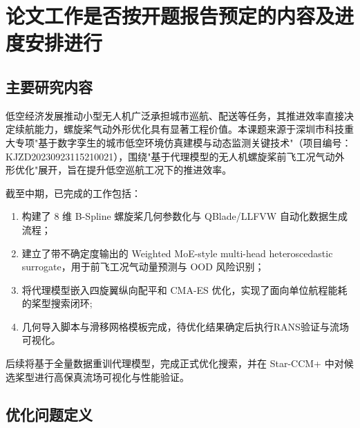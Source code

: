 
\section{论文工作是否按开题报告预定的内容及进度安排进行}

\subsection{主要研究内容}
低空经济发展推动小型无人机广泛承担城市巡航、配送等任务，其推进效率直接决定续航能力，螺旋桨气动外形优化具有显著工程价值。本课题来源于深圳市科技重大专项"基于数字孪生的城市低空环境仿真建模与动态监测关键技术"（项目编号：KJZD20230923115210021），围绕"基于代理模型的无人机螺旋桨前飞工况气动外形优化"展开，旨在提升低空巡航工况下的推进效率。

\noindent 截至中期，已完成的工作包括：
\begin{enumerate}
  \item 构建了 8 维 B-Spline 螺旋桨几何参数化与 QBlade/LLFVW 自动化数据生成流程；
  \item 建立了带不确定度输出的 Weighted MoE-style multi-head heteroscedastic surrogate，用于前飞工况气动量预测与 OOD 风险识别；
  \item 将代理模型嵌入四旋翼纵向配平和 CMA-ES 优化，实现了面向单位航程能耗的桨型搜索闭环;
  \item 几何导入脚本与滑移网格模板完成，待优化结果确定后执行RANS验证与流场可视化。
\end{enumerate}

后续将基于全量数据重训代理模型，完成正式优化搜索，并在 Star-CCM+ 中对候选桨型进行高保真流场可视化与性能验证。

\subsection{优化问题定义}

